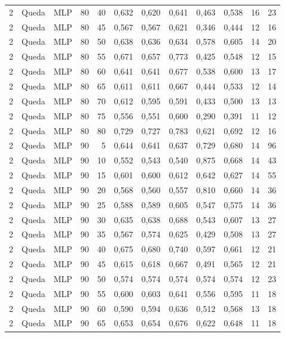 \begin{longtable}{@{}rllrrrrrrrrr@{}}
2 & Queda & MLP & 80 & 40 & 0,632 & 0,620 & 0,641 & 0,463 & 0,538 & 16 & 23 \\
2 & Queda & MLP & 80 & 45 & 0,567 & 0,567 & 0,621 & 0,346 & 0,444 & 12 & 16 \\
2 & Queda & MLP & 80 & 50 & 0,638 & 0,636 & 0,634 & 0,578 & 0,605 & 14 & 20 \\
2 & Queda & MLP & 80 & 55 & 0,671 & 0,657 & 0,773 & 0,425 & 0,548 & 12 & 15 \\
2 & Queda & MLP & 80 & 60 & 0,641 & 0,641 & 0,677 & 0,538 & 0,600 & 13 & 17 \\
2 & Queda & MLP & 80 & 65 & 0,611 & 0,611 & 0,667 & 0,444 & 0,533 & 12 & 14 \\
2 & Queda & MLP & 80 & 70 & 0,612 & 0,595 & 0,591 & 0,433 & 0,500 & 13 & 13 \\
2 & Queda & MLP & 80 & 75 & 0,556 & 0,551 & 0,600 & 0,290 & 0,391 & 11 & 12 \\
2 & Queda & MLP & 80 & 80 & 0,729 & 0,727 & 0,783 & 0,621 & 0,692 & 12 & 16 \\
2 & Queda & MLP & 90 & 5 & 0,644 & 0,641 & 0,637 & 0,729 & 0,680 & 14 & 96 \\
2 & Queda & MLP & 90 & 10 & 0,552 & 0,543 & 0,540 & 0,875 & 0,668 & 14 & 43 \\
2 & Queda & MLP & 90 & 15 & 0,601 & 0,600 & 0,612 & 0,642 & 0,627 & 14 & 55 \\
2 & Queda & MLP & 90 & 20 & 0,568 & 0,560 & 0,557 & 0,810 & 0,660 & 14 & 36 \\
2 & Queda & MLP & 90 & 25 & 0,588 & 0,589 & 0,605 & 0,547 & 0,575 & 14 & 36 \\
2 & Queda & MLP & 90 & 30 & 0,635 & 0,638 & 0,688 & 0,543 & 0,607 & 13 & 27 \\
2 & Queda & MLP & 90 & 35 & 0,567 & 0,574 & 0,625 & 0,429 & 0,508 & 13 & 27 \\
2 & Queda & MLP & 90 & 40 & 0,675 & 0,680 & 0,740 & 0,597 & 0,661 & 12 & 21 \\
2 & Queda & MLP & 90 & 45 & 0,615 & 0,618 & 0,667 & 0,491 & 0,565 & 12 & 21 \\
2 & Queda & MLP & 90 & 50 & 0,574 & 0,574 & 0,574 & 0,574 & 0,574 & 12 & 23 \\
2 & Queda & MLP & 90 & 55 & 0,600 & 0,603 & 0,641 & 0,556 & 0,595 & 11 & 18 \\
2 & Queda & MLP & 90 & 60 & 0,590 & 0,594 & 0,636 & 0,512 & 0,568 & 13 & 18 \\
2 & Queda & MLP & 90 & 65 & 0,653 & 0,654 & 0,676 & 0,622 & 0,648 & 11 & 18 \\

\end{longtable}
